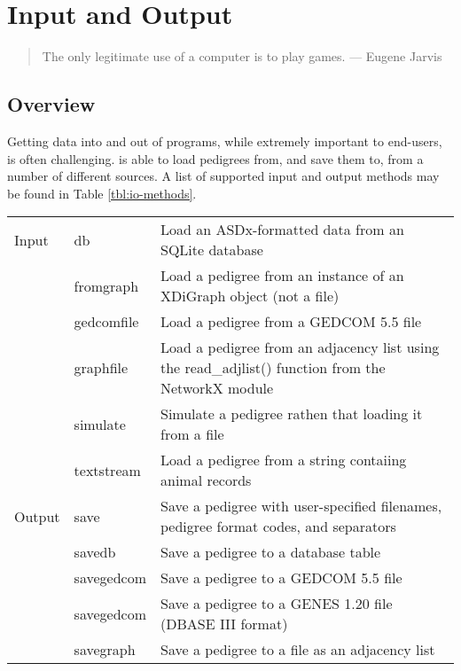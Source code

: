 \chapter{Input and Output}
\label{cha:inputoutput}
\begin{quote}
The only legitimate use of a computer is to play games. --- Eugene Jarvis
\end{quote}
\section{Overview}\label{sec:io-overview}
Getting data into and out of programs, while extremely important to end-users, is often challenging. \PyPedal{} is able to load pedigrees from, and save them to, from a number of different sources. A list of supported input and output methods may be found in Table \ref{tbl:io-methods}.
\begin{center}
    \tablelasttail{\hline}
    \label{tbl:io-methods}
    \begin{xtabular}{l|p{1in}|p{3in}}
    Input & db & Load an ASDx-formatted data from an SQLite database \\
     & fromgraph & Load a pedigree from an instance of an XDiGraph object (not a file) \\
     & gedcomfile & Load a pedigree from a GEDCOM 5.5 file \\
     & graphfile & Load a pedigree from an adjacency list using the read_adjlist() function from the NetworkX module \\
     & simulate & Simulate a pedigree rathen that loading it from a file \\
     & textstream & Load a pedigree from a string contaiing animal records \\
    Output & save & Save a pedigree with user-specified filenames, pedigree format codes, and separators \\
     & savedb & Save a pedigree to a database table \\
     & savegedcom & Save a pedigree to a GEDCOM 5.5 file \\
     & savegedcom & Save a pedigree to a GENES 1.20 file (DBASE III format) \\
     & savegraph & Save a pedigree to a file as an adjacency list \\
    \end{xtabular}
\end{center}
